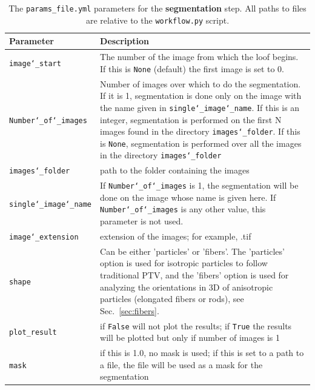 \documentclass[10pt,a4paper]{article}
\begin{document}
\begin{table}[!ht]
	\centering
	\caption{The \texttt{params\_file.yml} parameters for the \textbf{segmentation} step. All paths to files are relative to the \texttt{workflow.py} script. \label{tab:segment_params}}
	\begin{tabular}{l m{10cm}}
		\hline
		Parameter & Description\\
		\hline
		
		\texttt{image\char`_start} & The number of the image from which the loof begins. If this is \texttt{None} (default) the first image is set to 0.\\[.3em]
		
		\texttt{Number\char`_of\char`_images} & Number of images over which to do the segmentation. If it is 1, segmentation is done only on the image with the name given in \texttt{single\char`_image\char`_name}. If this is an integer, segmentation is performed on the first N images found in the directory \texttt{images\char`_folder}. If this is \texttt{None}, segmentation is performed over all the images in the directory \texttt{images\char`_folder} \\[.3em]
		
		\texttt{images\char`_folder} & path to the folder containing the images\\[.3em]
		
		\texttt{single\char`_image\char`_name} & If \texttt{Number\char`_of\char`_images} is 1, the segmentation will be done on the image whose name is given here. If \texttt{Number\char`_of\char`_images} is any other value, this parameter is not used. \\[.3em]
		
		\texttt{image\char`_extension} & extension of the images; for example, .tif\\[.3em]
		
		\texttt{shape} & Can be either 'particles' or 'fibers'. The 'particles' option is used for isotropic particles to follow traditional PTV, and the 'fibers' option is used for analyzing the orientations in 3D of anisotropic particles (elongated fibers or rods), see Sec.~\ref{sec:fibers}. \\[.3em]
		
		\texttt{plot\_result} & if \texttt{False} will not plot the results; if \texttt{True} the results will be plotted but only if number of images is 1 \\[.3em]
		
		\texttt{mask} & if this is 1.0, no mask is used; if this is set to a path to a file, the file will be used as a mask for the segmentation \\[.3em]
		

\end{tabular}
\end{table}
\end{document}
